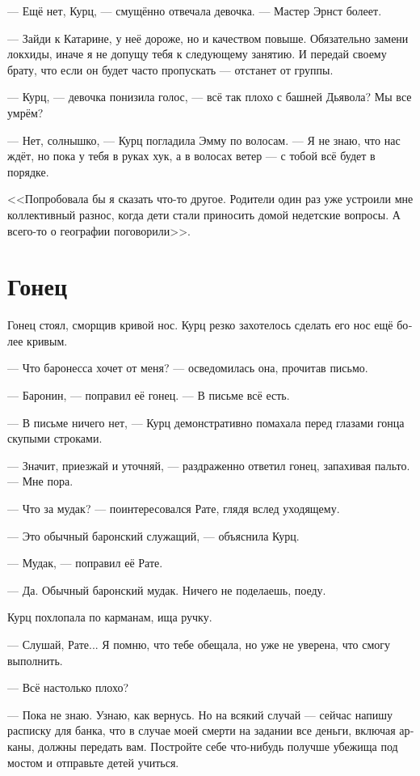 \documentclass[a4paper,12pt,fleqn]{book}\usepackage{polyglossia}\setdefaultlanguage[babelshorthands=true]{russian}\setotherlanguage{english}\defaultfontfeatures{Ligatures=TeX,Mapping=tex-text}\usepackage{xcolor}\newcommand{\ml}[3]{#2}
\begin{document}
--- Ещё нет, Курц, --- смущённо отвечала девочка.
--- Мастер Эрнст болеет.

--- Зайди к Катарине, у неё дороже, но и качеством повыше.
Обязательно замени локхиды, иначе я не допущу тебя к следующему занятию.
И передай своему брату, что если он будет часто пропускать --- отстанет от группы.

--- Курц, --- девочка понизила голос, --- всё так плохо с башней Дьявола?
Мы все умрём?

--- Нет, солнышко, --- Курц погладила Эмму по волосам.
--- Я не знаю, что нас ждёт, но пока у тебя в руках хук, а в волосах ветер --- с тобой всё будет в порядке.

<<Попробовала бы я сказать что-то другое.
Родители один раз уже устроили мне коллективный разнос, когда дети стали приносить домой недетские вопросы.
А всего-то о географии поговорили>>.

\section{Гонец}

Гонец стоял, сморщив кривой нос.
Курц резко захотелось сделать его нос ещё более кривым.

--- Что баронесса хочет от меня? --- осведомилась она, прочитав письмо.

--- Баронин, --- поправил её гонец.
--- В письме всё есть.

--- В письме ничего нет, --- Курц демонстративно помахала перед глазами гонца скупыми строками.

--- Значит, приезжай и уточняй, --- раздраженно ответил гонец, запахивая пальто.
--- Мне пора.

--- Что за мудак? --- поинтересовался Рате, глядя вслед уходящему.

--- Это обычный баронский служащий, --- объяснила Курц.

--- Мудак, --- поправил её Рате.

--- Да.
Обычный баронский мудак.
Ничего не поделаешь, поеду.

Курц похлопала по карманам, ища ручку.

--- Слушай, Рате...
Я помню, что тебе обещала, но уже не уверена, что смогу выполнить.

--- Всё настолько плохо?

--- Пока не знаю.
Узнаю, как вернусь.
Но на всякий случай --- сейчас напишу расписку для банка, что в случае моей смерти на задании все деньги, включая арканы, должны передать вам.
Постройте себе что-нибудь получше убежища под мостом и отправьте детей учиться.
\end{document}
